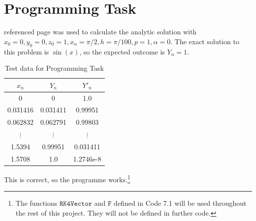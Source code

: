\documentclass[10pt,a4paper,notitlepage]{article}
\begin{document}
\section*{\centering \large Programming Task}
 referenced page \pageref{subsec:Code 7.1} was used to calculate the analytic solution with $x_{0}=0, y_{0}=0, z_{0}=1, x_{n}=\pi/2, h=\pi/100, p=1, \alpha=0$. The exact solution to this problem is $\sin\left(x\right)$, so the expected outcome is $Y_{n}=1$. 
\begin{table}[H]
\centering
\begin{tabular}{|c|c|c|} \hline$x_{n}$&$Y_{n}$&$Y'_{n}$\\ \hline 0 & 0 & 1.0\\ 0.031416 & 0.031411 & 0.99951\\ 0.062832 & 0.062791 & 0.99803\\ $\vdots$&$\vdots$&$\vdots$ \\ 1.5394 & 0.99951 & 0.031411\\ 1.5708 & 1.0 & 1.2746e-8\\ \hline\end{tabular}
\caption{Test data for Programming Task}
\end{table}
This is correct, so the programme works.\footnote{The functions $\mathtt{RK4Vector}$ and $\mathtt{F}$ defined in Code 7.1 will be used throughout the rest of this project. They will not be defined in further code.}
\end{document}
